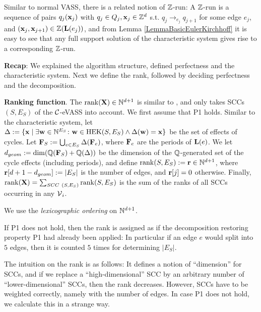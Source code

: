 Similar to normal VASS, there is a related notion of \(\mathbb{Z}\)-run: A \(\mathbb{Z}\)-run is a sequence of pairs \(q_j(\mathbf{x}_j)\) with \(q_j \in Q_j, \mathbf{x}_j \in \mathbb{Z}^d\) s.t. \(q_j \to_{e_j} q_{j+1}\) for some edge \(e_j\), and \((\mathbf{x}_j, \mathbf{x}_{j+1}) \in \mathbb{Z}(\mathbf{L}(e_j))\), and from Lemma \ref{LemmaBasicEulerKirchhoff} it is easy to see that any full support solution of the characteristic system gives rise to a corresponding \(\mathbb{Z}\)-run.

\textbf{Recap}: We explained the algorithm structure, defined perfectness and the characteristic system. Next we define the rank, followed by deciding perfectness and the decomposition.

\begin{definition}
\textbf{Ranking function}. The \(\operatorname{rank}(\mathbf{X}) \in \mathbb{N}^{d+1}\) is similar to \cite{LerouxS19}, and only takes SCCs \((S, E_S)\) of the \(\mathcal{C}\)-eVASS into account. We first assume that P1 holds. Similar to the characteristic system, let \(\Delta:=\{\mathbf{x} \mid \exists \mathbf{w} \in \mathbb{N}^{E_S} \colon \mathbf{w} \in \text{HEK}(S, E_S) \wedge \operatorname{\operatorname{\Delta}}(\mathbf{w})=\mathbf{x}\}\) be the set of effects of cycles. Let \(\mathbf{F}_S:=\bigcup_{e \in E_S} \operatorname{\operatorname{\Delta}}(\mathbf{F}_e)\), where \(\mathbf{F}_e\) are the periods of \(\mathbf{L}(e)\). We let \(d_{geom}:=\dim(\mathbb{Q}(\mathbf{F}_S)+\mathbb{Q}(\Delta))\) be the dimension of the \(\mathbb{Q}\)-generated set of the cycle effects (including periods), and define \(\operatorname{rank}(S, E_S):=\mathbf{r} \in \mathbb{N}^{d+1}\), where \(\mathbf{r}[d+1-d_{geom}]:=|E_S|\) is the number of edges, and \(\mathbf{r}[j]=0\) otherwise. Finally, \(\operatorname{rank}(\mathbf{X})=\sum_{SCC\ (S, E_S)} \operatorname{rank}(S, E_S)\) is the sum of the ranks of all SCCs occurring in any \(\operatorname{\mathcal{V}}_i\).

We use the \emph{lexicographic ordering} on \(\mathbb{N}^{d+1}\). 

If P1 does not hold, then the rank is assigned as if the decomposition restoring property P1 had already been applied: In particular if an edge \(e\) would split into \(5\) edges, then it is counted \(5\) times for determining \(|E_S|\).
\end{definition}

The intuition on the rank is as follows: It defines a notion of ``dimension'' for SCCs, and if we replace a ``high-dimensional'' SCC by an arbitrary number of ``lower-dimensional'' SCCs, then the rank decreases. However, SCCs have to be weighted correctly, namely with the number of edges. In case P1 does not hold, we calculate this in a strange way.

